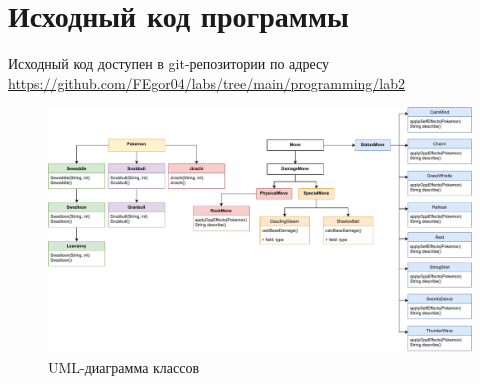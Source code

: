 \section{Исходный код программы}
Исходный код доступен в git-репозитории по адресу \url{https://github.com/FEgor04/labs/tree/main/programming/lab2}

\begin{figure}[ht]
    \centering
    \includegraphics[scale=0.5]{img/uml.pdf}
    \caption[]{UML-диаграмма классов}
\end{figure}